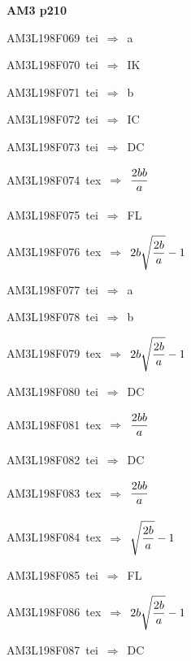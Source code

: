 \par\vfill\eject
{\bf\hfill AM3 p210\hfill\hbox{}}\par\bigskip
{\sixrm AM3L198F069\ {\sixit tei}\ }$\Rightarrow$\ {\tenit a}\par\smallskip
{\sixrm AM3L198F070\ {\sixit tei}\ }$\Rightarrow$\ IK\par\smallskip
{\sixrm AM3L198F071\ {\sixit tei}\ }$\Rightarrow$\ {\tenit b}\par\smallskip
{\sixrm AM3L198F072\ {\sixit tei}\ }$\Rightarrow$\ IC\par\smallskip
{\sixrm AM3L198F073\ {\sixit tei}\ }$\Rightarrow$\ DC\par\smallskip
{\sixrm AM3L198F074\ {\sixit tex}\ }$\Rightarrow$\ ${\displaystyle\strut 2bb\over \displaystyle\strut a}$\par\smallskip
{\sixrm AM3L198F075\ {\sixit tei}\ }$\Rightarrow$\ FL\par\smallskip
{\sixrm AM3L198F076\ {\sixit tex}\ }$\Rightarrow$\ $2b\sqrt{{\displaystyle\strut 2b\over \displaystyle\strut a}} - 1$\par\smallskip
{\sixrm AM3L198F077\ {\sixit tei}\ }$\Rightarrow$\ {\tenit a}\par\smallskip
{\sixrm AM3L198F078\ {\sixit tei}\ }$\Rightarrow$\ {\tenit b}\par\smallskip
{\sixrm AM3L198F079\ {\sixit tex}\ }$\Rightarrow$\ $2b\sqrt{{\displaystyle\strut 2b\over \displaystyle\strut a}} - 1$\par\smallskip
{\sixrm AM3L198F080\ {\sixit tei}\ }$\Rightarrow$\ DC\par\smallskip
{\sixrm AM3L198F081\ {\sixit tex}\ }$\Rightarrow$\ ${\displaystyle\strut 2bb\over \displaystyle\strut a}$\par\smallskip
{\sixrm AM3L198F082\ {\sixit tei}\ }$\Rightarrow$\ DC\par\smallskip
{\sixrm AM3L198F083\ {\sixit tex}\ }$\Rightarrow$\ ${\displaystyle\strut 2bb\over \displaystyle\strut a}$\par\smallskip
{\sixrm AM3L198F084\ {\sixit tex}\ }$\Rightarrow$\ $\sqrt{{\displaystyle\strut 2b\over \displaystyle\strut a}} - 1$\par\smallskip
{\sixrm AM3L198F085\ {\sixit tei}\ }$\Rightarrow$\ FL\par\smallskip
{\sixrm AM3L198F086\ {\sixit tex}\ }$\Rightarrow$\ $2b\sqrt{{\displaystyle\strut 2b\over \displaystyle\strut a}} - 1$\par\smallskip
{\sixrm AM3L198F087\ {\sixit tei}\ }$\Rightarrow$\ DC\par\smallskip

